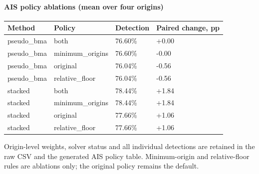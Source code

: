 \paragraph{AIS policy ablations (mean over four origins)}
\begin{center}\small\begin{tabular}{llll}
\toprule
Method & Policy & Detection & Paired change, pp\\\midrule
pseudo\_bma & both & 76.60\% & +0.00\\
pseudo\_bma & minimum\_origins & 76.60\% & -0.00\\
pseudo\_bma & original & 76.04\% & -0.56\\
pseudo\_bma & relative\_floor & 76.04\% & -0.56\\
stacked & both & 78.44\% & +1.84\\
stacked & minimum\_origins & 78.44\% & +1.84\\
stacked & original & 77.66\% & +1.06\\
stacked & relative\_floor & 77.66\% & +1.06\\
\bottomrule\end{tabular}\end{center}

Origin-level weights, solver status and all individual detections are retained in the raw CSV and the generated AIS policy table. Minimum-origin and relative-floor rules are ablations only; the original policy remains the default.

\clearpage

